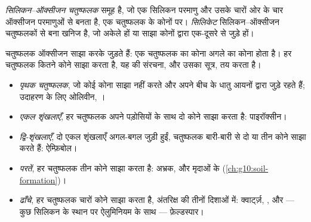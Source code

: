 \begin{definition}[सिलिकेट; सिलिकन--ऑक्सीजन चतुष्फलक]\label{def:g11:minerals:silicate}
\emph{सिलिकन--ऑक्सीजन चतुष्फलक}
समूह  है, जो एक सिलिकन परमाणु और उसके चारों ओर के चार ऑक्सीजन
परमाणुओं से बनता है, एक चतुष्फलक के कोनों पर। \emph{सिलिकेट}
सिलिकन--ऑक्सीजन चतुष्फलकों से बना खनिज है, जो अकेले हों या साझा कोनों
द्वारा एक-दूसरे से जुड़े हों।
\end{definition}

चतुष्फलक ऑक्सीजन साझा करके जुड़ते हैं: एक चतुष्फलक का कोना अगले का
कोना होता है। हर चतुष्फलक कितने कोने साझा करता है, यह
 की संरचना, और उसका सूत्र, तय करता है।
\begin{itemize}
  \item \emph{पृथक चतुष्फलक}, जो कोई कोना साझा नहीं करते और अपने बीच के
        धातु आयनों द्वारा जुड़े रहते हैं; उदाहरण के लिए ओलिवीन, ।
  \item \emph{एकल शृंखलाएँ}, हर चतुष्फलक अपने पड़ोसियों के साथ दो कोने
        साझा करता है: पाइरॉक्सीन।
  \item \emph{द्वि-शृंखलाएँ}, दो एकल शृंखलाएँ अगल-बगल जुड़ी हुईं,
        चतुष्फलक बारी-बारी से दो या तीन कोने साझा करते हैं: ऐम्फ़िबोल।
  \item \emph{परतें}, हर चतुष्फलक तीन कोने साझा करता है: अभ्रक,
        और मृदाओं के  (\cref{ch:g10:soil-formation})।
  \item \emph{ढाँचे}, हर चतुष्फलक चारों कोने साझा करता है, अंतरिक्ष की तीनों
        दिशाओं में: क्वार्ट्ज़, , और --- कुछ सिलिकन के स्थान पर
        ऐलुमिनियम के साथ --- फ़ेल्डस्पार।
\end{itemize}

